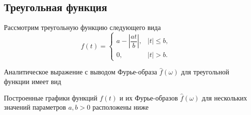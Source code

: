 \documentclass[a4paper, 16pt]{article}
\begin{document}
    \subsection{Треугольная функция}
    \noindent Рассмотрим треугольную функцию следующего вида
    $$
    f(t)=
    \begin{cases}
        a-\left|\dfrac{at}{b}\right|, & \left|t\right|\leq b,\\
        0, & \left|t\right|>b.
    \end{cases}
    $$


    \noindent Аналитическое выражение с выводом Фурье-образа
    $\hat{f}(\omega)$ для треугольной функции имеет вид


    \noindent Построенные графики функций $f(t)$ и их Фурье-образов
    $\hat{f}\left(\omega\right)$ для нескольких значений параметров $a,b>0$ расположены ниже
\end{document}
